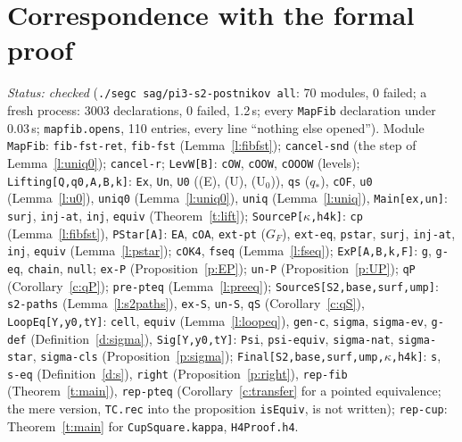 \documentclass[11pt]{amsart}
\theoremstyle{definition}
\theoremstyle{remark}
\newcommand{\code}[1]{\texttt{#1}}
\begin{document}
\section{Correspondence with the formal proof}\label{sec:corr}
\emph{Status: checked} (\code{./segc sag/pi3-s2-postnikov all}: 70 modules,
0 failed; a fresh process: 3003 declarations, 0 failed, 1.2\,s; every
\code{MapFib} declaration under 0.03\,s; \code{mapfib.opens}, 110 entries,
every line ``nothing else opened''). Module \code{MapFib}:
\code{fib-fst-ret}, \code{fib-fst} (Lemma~\ref{l:fibfst});
\code{cancel-snd} (the step of Lemma~\ref{l:uniq0}); \code{cancel-r};
\code{LevW[B]}: \code{cOW}, \code{cOOW}, \code{cOOOW} (levels);
\code{Lifting[Q,q0,A,B,k]}: \code{Ex}, \code{Un}, \code{U0} ((E), (U),
(U$_0$)), \code{qs} ($q_*$), \code{cOF}, \code{u0} (Lemma~\ref{l:u0}),
\code{uniq0} (Lemma~\ref{l:uniq0}), \code{uniq} (Lemma~\ref{l:uniq}),
\code{Main[ex,un]}: \code{surj}, \code{inj-at}, \code{inj}, \code{equiv}
(Theorem~\ref{t:lift}); \code{SourceP[$\kappa$,h4k]}: \code{cp}
(Lemma~\ref{l:fibfst}), \code{PStar[A]}: \code{EA}, \code{cOA},
\code{ext-pt} ($G_F$), \code{ext-eq}, \code{pstar}, \code{surj},
\code{inj-at}, \code{inj}, \code{equiv} (Lemma~\ref{l:pstar}); \code{cOK4},
\code{fseq} (Lemma~\ref{l:fseq}); \code{ExP[A,B,k,F]}: \code{g},
\code{g-eq}, \code{chain}, \code{null}; \code{ex-P}
(Proposition~\ref{p:EP}); \code{un-P} (Proposition~\ref{p:UP}); \code{qP}
(Corollary~\ref{c:qP}); \code{pre-pteq} (Lemma~\ref{l:preeq});
\code{SourceS[S2,base,surf,ump]}: \code{s2-paths} (Lemma~\ref{l:s2paths}),
\code{ex-S}, \code{un-S}, \code{qS} (Corollary~\ref{c:qS}),
\code{LoopEq[Y,y0,tY]}: \code{cell}, \code{equiv} (Lemma~\ref{l:loopeq}),
\code{gen-c}, \code{sigma}, \code{sigma-ev}, \code{g-def}
(Definition~\ref{d:sigma}), \code{Sig[Y,y0,tY]}: \code{Psi},
\code{psi-equiv}, \code{sigma-nat}, \code{sigma-star}, \code{sigma-cls}
(Proposition~\ref{p:sigma}); \code{Final[S2,base,surf,ump,$\kappa$,h4k]}:
\code{s}, \code{s-eq} (Definition~\ref{d:s}), \code{right}
(Proposition~\ref{p:right}), \code{rep-fib} (Theorem~\ref{t:main}),
\code{rep-pteq} (Corollary~\ref{c:transfer} for a pointed equivalence; the
mere version, \code{TC.rec} into the proposition \code{isEquiv}, is not
written); \code{rep-cup}: Theorem~\ref{t:main} for \code{CupSquare.kappa},
\code{H4Proof.h4}.
\end{document}
